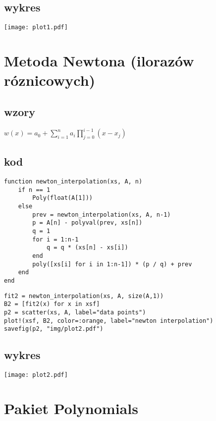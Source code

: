 \subsection{\bf wykres}
\begin{center}
    \texttt{[image: plot1.pdf]}
    \label{fig:1}
\end{center}
\clearpage
\section{\bf Metoda Newtona (ilorazów róznicowych)}

\subsection{\bf wzory}
$w(x) = a_0 + \displaystyle \sum_{i=1}^{n} a_i \prod_{j=0}^{i-1} (x-x_j)$

\subsection{\bf kod}
\begin{lstlisting}
function newton_interpolation(xs, A, n)
    if n == 1
        Poly(float(A[1]))
    else
        prev = newton_interpolation(xs, A, n-1)
        p = A[n] - polyval(prev, xs[n])
        q = 1
        for i = 1:n-1
            q = q * (xs[n] - xs[i])
        end        
        poly([xs[i] for i in 1:n-1]) * (p / q) + prev
    end
end
\end{lstlisting}
\begin{lstlisting}
fit2 = newton_interpolation(xs, A, size(A,1))
B2 = [fit2(x) for x in xsf]
p2 = scatter(xs, A, label="data points")
plot!(xsf, B2, color=:orange, label="newton interpolation")
savefig(p2, "img/plot2.pdf")
\end{lstlisting}

\subsection{\bf wykres}
\begin{center}
    \texttt{[image: plot2.pdf]}
    \label{fig:2}
\end{center}
\clearpage
\section{\bf Pakiet Polynomials}

